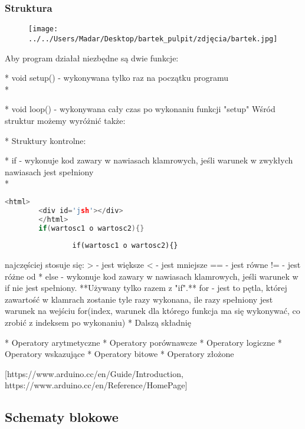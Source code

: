 \subsubsection  {Struktura}
\begin{figure}
	\centering
		\texttt{[image: ../../Users/Madar/Desktop/bartek\_pulpit/zdjęcia/bartek.jpg]}
	\label{fig:bartek}
\end{figure}
Aby program działał niezbędne są dwie funkcje:

  * void setup() - wykonywana tylko raz na początku programu\\*
	
  * void loop() - wykonywana cały czas po wykonaniu funkcji "setup"
Wśród struktur możemy wyróżnić także:

  * Struktury kontrolne:

    * if - wykonuje kod zawary w nawiasach klamrowych, jeśli warunek w zwykłych nawiasach jest spełniony\\*
		\begin{lstlisting}[language=C++]
		<html>
		<div id='jsh'></div>
		</html>
		if(wartosc1 o wartosc2){}
\end{lstlisting}
		\begin{verbatim}
				if(wartosc1 o wartosc2){}
		\end{verbatim}
		\verb||
		
		najczęściej stosuje się:
		> - jest większe
		< - jest mniejsze
		== - jest równe
		!= - jest różne od
    * else - wykonuje kod zawary w nawiasach klamrowych, jeśli warunek w if nie jest spełniony. **Używany tylko razem z "if".**
	for - jest to pętla, której zawartość w klamrach zostanie tyle razy wykonana, ile razy spełniony jest warunek na wejściu 
	for(index, warunek dla którego funkcja ma się wykonywać, co zrobić z indeksem po wykonaniu)
  * Dalszą składnię
  
  * Operatory arytmetyczne
  * Operatory porównawcze
  * Operatory logiczne
  * Operatory wskazujące
  * Operatory bitowe
  * Operatory złożone

[https://www.arduino.cc/en/Guide/Introduction, https://www.arduino.cc/en/Reference/HomePage]

	\subsection {Schematy blokowe}
